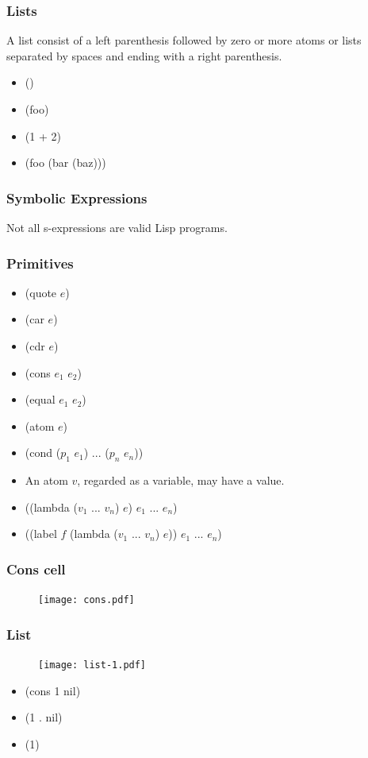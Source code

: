 \documentclass[16pt]{beamer}
\begin{document}
\begin{frame}
  \frametitle{Lists}
  \begin{block}{}
    A list consist of a left parenthesis followed by zero or more
    atoms or lists separated by spaces and ending with a right
    parenthesis.
  \end{block}
  \begin{itemize}
  \item ()
  \item (foo)
  \item (1 + 2)
  \item (foo (bar (baz)))
  \end{itemize}
\end{frame}

\begin{frame}
  \frametitle{Symbolic Expressions}
  \begin{block}{}
    Not all s-expressions are valid Lisp programs.
  \end{block}
\end{frame}

\begin{frame}
  \frametitle{Primitives}
  \begin{itemize}
  \item (quote $e$)
  \item (car $e$)
  \item (cdr $e$)
  \item (cons $e_1$ $e_2$)
  \item (equal $e_1$ $e_2$)
  \item (atom $e$)
  \item (cond ($p_1$ $e_1$) ... ($p_n$ $e_n$))
  \item An atom $v$, regarded as a variable, may have a value.
  \item ((lambda ($v_1$ ... $v_n$) $e$) $e_1$ ... $e_n$)
  \item ((label $f$ (lambda ($v_1$ ... $v_n$) $e$)) $e_1$ ... $e_n$)
  \end{itemize}
\end{frame}

\begin{frame}
  \frametitle{Cons cell}
  \begin{figure}
    \texttt{[image: cons.pdf]}
  \end{figure}
\end{frame}

\begin{frame}
  \frametitle{List}
  \begin{figure}
    \texttt{[image: list-1.pdf]}
  \end{figure}
  \begin{itemize}
  \item (cons 1 nil)
  \item (1 . nil)
  \item (1)
  \end{itemize}
\end{frame}
\end{document}
